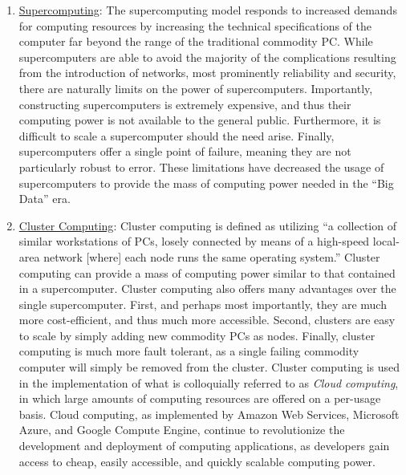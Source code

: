 \documentclass[twoside]{report}
\begin{document}
\begin{enumerate}
  \item \underline{Supercomputing}: The supercomputing model responds to
    increased demands for computing resources by increasing the technical
    specifications of the computer far beyond the range of the
    traditional commodity PC.
    While supercomputers are able to avoid the majority of the complications
    resulting from the introduction of networks, most prominently reliability and
    security, there are naturally limits on the power of supercomputers.
    Importantly, constructing supercomputers is extremely expensive, and thus
    their computing power is not available to the general public. Furthermore,
    it is difficult to scale a supercomputer should the need arise. Finally,
    supercomputers offer a single point of failure, meaning they are not
    particularly robust to error. These limitations have decreased the usage of
    supercomputers to provide the mass of computing power needed in the ``Big
    Data'' era.

  \item \underline{Cluster Computing}: Cluster computing is defined as utilizing
    ``a collection of similar workstations of PCs, losely connected by means of
    a high-speed local-area network [where] each node runs the same operating
    system.''\cite[pg. 17-18]{distributed-systems-principles-and-paradigms}
    Cluster computing can provide a mass of computing power similar to
    that contained in a supercomputer. Cluster computing also offers many
    advantages over the single supercomputer. First, and perhaps most
    importantly, they are much more cost-efficient, and thus much more
    accessible. Second, clusters are easy to
    scale by simply adding new commodity PCs as nodes.
    Finally, cluster computing is much more fault
    tolerant, as a single failing commodity computer will simply be removed
    from the cluster. Cluster computing is used in the
    implementation of what is colloquially referred to as \textit{Cloud
    computing}, in which large amounts of computing resources are offered on a
    per-usage basis.\cite[pg. 13]{distributed-systems-concepts-and-design}
    Cloud computing, as implemented by Amazon Web
    Services,\cite{amazon-web-services} Microsoft Azure,\cite{microsoft-azure}
    and Google Compute Engine,\cite{google-compute-engine} continue to
    revolutionize the development and deployment of computing applications, as
    developers gain access to cheap, easily accessible, and quickly scalable
    computing power.


\end{enumerate}
\end{document}
